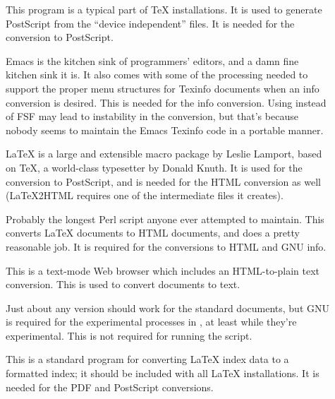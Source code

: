 \documentclass{howto}
\begin{document}
    \begin{description}
      \item[]
        This program is a typical part of \TeX{} installations.  It is
        used to generate PostScript from the ``device independent''
         files.  It is needed for the conversion to
        PostScript.

      \item[]
        Emacs is the kitchen sink of programmers' editors, and a damn
        fine kitchen sink it is.  It also comes with some of the
        processing needed to support the proper menu structures for
        Texinfo documents when an info conversion is desired.  This is
        needed for the info conversion.  Using 
        instead of FSF  may lead to instability in the
        conversion, but that's because nobody seems to maintain the
        Emacs Texinfo code in a portable manner.

      \item[]
        \LaTeX{} is a large and extensible macro package by Leslie
        Lamport, based on \TeX, a world-class typesetter by Donald
        Knuth.  It is used for the conversion to PostScript, and is
        needed for the HTML conversion as well (\LaTeX2HTML requires
        one of the intermediate files it creates).

      \item[]
        Probably the longest Perl script anyone ever attempted to
        maintain.  This converts \LaTeX{} documents to HTML documents,
        and does a pretty reasonable job.  It is required for the
        conversions to HTML and GNU info.

      \item[]
        This is a text-mode Web browser which includes an
        HTML-to-plain text conversion.  This is used to convert
         documents to text.

      \item[]
        Just about any version should work for the standard documents,
        but GNU  is required for the experimental
        processes in , at least while
        they're experimental.  This is not required for running the
         script.

      \item[]
        This is a standard program for converting \LaTeX{} index data
        to a formatted index; it should be included with all \LaTeX{}
        installations.  It is needed for the PDF and PostScript
        conversions.


\end{description}
\end{document}
